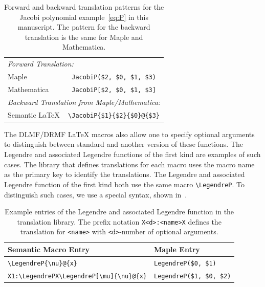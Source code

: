 \documentclass[a4paper,11pt]{article}
\newcommand{\DLMF}{DLMF}
\newcommand{\DRMF}{DRMF}
\newcommand{\Maple}{Maple}
\newcommand{\Mathematica}{Mathematica}
\newcommand{\Macro}{\DLMF/\DRMF{} \LaTeX{} macro}
\theoremstyle{defTheoStyle}
\theoremstyle{defExampStyle}
\begin{document}
\begin{table}[ht]
	\centering
	\begin{tabular}{lc}
		\hline
		\multicolumn{2}{l}{\textit{Forward Translation:}} \\
		\Maple & \verb|JacobiP($2, $0, $1, $3)| \\
		\Mathematica & \verb|JacobiP[$2, $0, $1, $3]|\\
		\hline
		\multicolumn{2}{l}{\textit{Backward Translation from \Maple/\Mathematica:}} \\
		Semantic \LaTeX & \verb|\JacobiP{$1}{$2}{$0}@{$3}|\\
		\hline
	\end{tabular}
	\caption{Forward and backward translation patterns for the Jacobi polynomial example~\eqref{eq:P} in this manuscript. The pattern for the backward translation is the same for \Maple{} and \Mathematica.}
	\label{tab:placeholder_ex2}
\end{table}

The \Macro s also allow one to specify optional arguments to distinguish between standard and another version of these functions. The Legendre and associated Legendre functions of the first kind are examples of such cases. The library that defines translations for each macro uses the macro name as the primary key to identify the translations. The Legendre and associated Legendre function of the first kind both use the same macro \verb|\LegendreP|. To distinguish such cases, we use a special syntax, shown in~.

\begin{table}[ht!]
	\centering
	\begin{tabular}{ll}
		\hline
		Semantic Macro Entry & \Maple{} Entry \\
		\hline
		\verb|\LegendreP{\nu}@{x}| & \verb|LegendreP($0, $1)| \\
		\verb|X1:\LegendrePX\LegendreP[\mu]{\nu}@{x}| & \verb|LegendreP($1, $0, $2)|\\
		\hline
	\end{tabular}
	\caption{Example entries of the Legendre and associated Legendre function in the translation library. The prefix notation \texttt{X<d>:<name>X} defines the translation for \texttt{<name>} with \texttt{<d>}-number of optional arguments.}
	\label{tab:legendreP-lex}
\end{table}
\end{document}
